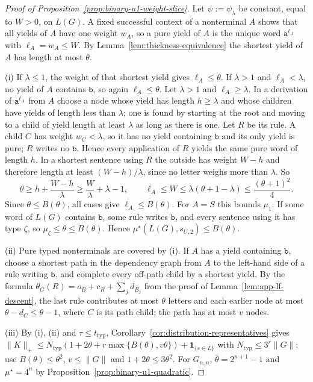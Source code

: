 \documentclass[11pt]{article}
\numberwithin{equation}{section}
\theoremstyle{plain}
\theoremstyle{definition}
\theoremstyle{remark}
\newcommand{\eps}{\varepsilon}
\theoremstyle{plain}
\begin{document}
\begin{proof}[Proof of Proposition~\ref{prop:binary-u1-weight-slice}]
Let $\psi:=\psi_\lambda$ be constant, equal to $W>0$, on $L(G)$.  A fixed
successful context of a nonterminal $A$ shows that all yields of $A$ have one
weight $w_A$, so a pure yield of $A$ is the unique word $\mathtt a^{\ell_A}$ with
$\ell_A=w_A\le W$.  By Lemma~\ref{lem:thickness-equivalence} the shortest yield
of $A$ has length at most $\theta$.

(i) If $\lambda\le1$, the weight of that shortest yield gives $\ell_A\le\theta$.
If $\lambda>1$ and $\ell_A<\lambda$, no yield of $A$ contains $\mathtt b$, so again
$\ell_A\le\theta$.  Let $\lambda>1$ and $\ell_A\ge\lambda$.  In a derivation of
$\mathtt a^{\ell_A}$ from $A$ choose a node whose yield has length $h\ge\lambda$ and
whose children have yields of length less than $\lambda$; one is found by
starting at the root and moving to a child of yield length at least $\lambda$ as
long as there is one.  Let $R$ be its rule.  A child $C$ has weight $w_C<\lambda$, so it has no yield containing
$\mathtt b$ and its only yield is pure; $R$ writes no $\mathtt b$.  Hence every
application of $R$ yields the same pure word of length $h$.  In a shortest
sentence using $R$ the outside has weight $W-h$ and therefore length at least
$(W-h)/\lambda$, since no letter weighs more than $\lambda$.  So
\[
 \theta\ge h+\frac{W-h}{\lambda}\ge\frac W\lambda+\lambda-1,
 \qquad
 \ell_A\le W\le\lambda(\theta+1-\lambda)\le\frac{(\theta+1)^2}{4}.
\]
Since $\theta\le B(\theta)$, all cases give $\ell_A\le B(\theta)$.  For $A=S$
this bounds $\mu_1$.  If some word of $L(G)$ contains $\mathtt b$, some rule writes
$\mathtt b$, and every sentence using it has type $\zeta$, so
$\mu_\zeta\le\theta\le B(\theta)$.  Hence $\mu^\star(L(G),s_{U,2})\le B(\theta)$.

(ii) Pure typed nonterminals are covered by (i).  If $A$ has a yield containing
$\mathtt b$, choose a shortest path in the dependency graph from $A$ to the
left-hand side of a rule writing $\mathtt b$, and complete every off-path child by
a shortest yield.  By the formula
$\theta_G(R)=o_B+c_R+\sum_jd_{B_j}$ from the proof of
Lemma~\ref{lem:app-lf-descent}, the last rule contributes at most $\theta$
letters and each earlier node at most $\theta-d_C\le\theta-1$, where $C$ is its
path child; the path has at most $v$ nodes.

(iii) By (i), (ii) and $\tau\le t_{\mathrm{typ}}$,
Corollary~\ref{cor:distribution-representatives} gives
$\|K\|_+\le N_{\mathrm{typ}}(1+2\theta+r\max\{B(\theta),v\theta\})+\mathbf 1_{\{\eps\in L\}}$
with $N_{\mathrm{typ}}\le3^r\|G\|$; use $B(\theta)\le\theta^2$, $v\le\|G\|$ and
$1+2\theta\le3\theta^2$.  For $G_{n,n}$, $\bar\theta=2^{n+1}-1$ and $\mu^\star=4^n$ by
Proposition~\ref{prop:binary-u1-quadratic}.
\end{proof}
\end{document}
